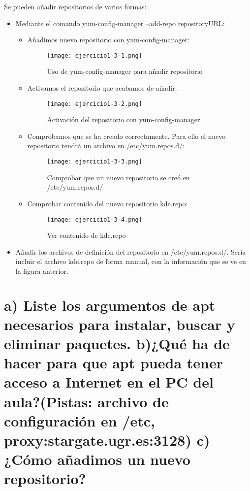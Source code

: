 	Se pueden añadir repositorios de varios formas\cite{ejercicio1-3,ejercicio1-4,ejercicio1-5}:
	\begin{itemize}
		\item Mediante el comando yum-config-manager --add-repo repositoryURL:
		\begin{itemize}
			\item Añadimos nuevo repositorio con yum-config-manager:
				\begin{figure}[H] 
					\centering
					\texttt{[image: ejercicio1-3-1.png]} 
					\label{figura8} 
					\caption{Uso de yum-config-manager para añadir repositorio}
				\end{figure}
			\item Activamos el repositorio que acabamos de añadir.
				\begin{figure}[H] 
					\centering
					\texttt{[image: ejercicio1-3-2.png]} 
					\label{figura9} 
					\caption{Activación del repositorio con yum-config-manager}
				\end{figure}
			\item Comprobamos que se ha creado correctamente. Para ello el nuevo repositorio tendrá un archivo en /etc/yum.repos.d/:
				\begin{figure}[H] 
					\centering
					\texttt{[image: ejercicio1-3-3.png]} 
					\label{figura10} 
					\caption{Comprobar que un nuevo repositorio se creó en /etc/yum.repos.d/}
				\end{figure}
			\item Comprobar contenido del nuevo repositorio kde.repo:
				\begin{figure}[H] 
					\centering
					\texttt{[image: ejercicio1-3-4.png]} 
					\label{figura11} 
					\caption{Ver contenido de kde.repo}
				\end{figure}
			
		\end{itemize}
		 		
		\item Añadir los archivos de definición del repositorio en /etc/yum.repos.d/. Sería incluir el archivo kde.repo de forma manual, con la información que se ve en la figura anterior.	 
	\end{itemize}
	
	
	\section{a) Liste los argumentos de apt necesarios para instalar, buscar y eliminar paquetes. b)¿Qué ha de hacer para que apt pueda tener acceso a Internet en el PC del aula?(Pistas: archivo de configuración en /etc, proxy:stargate.ugr.es:3128) c)¿Cómo añadimos un nuevo repositorio?}
	

